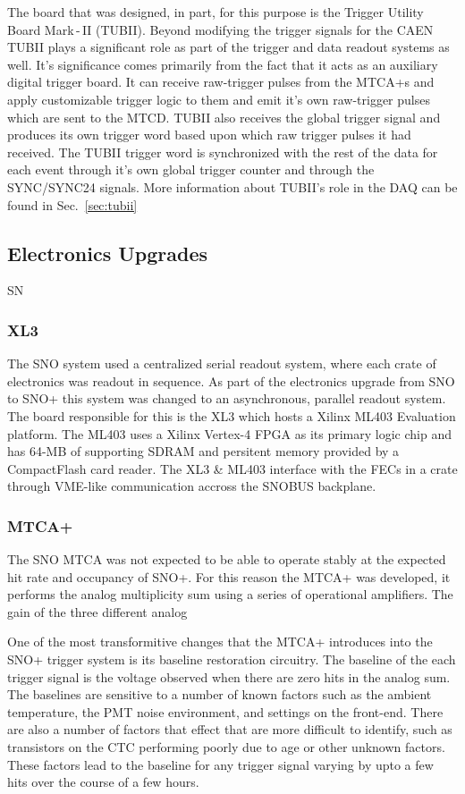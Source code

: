 The board that was designed, in part, for this purpose is the Trigger Utility
Board Mark\,-\,II (TUBII).
Beyond modifying the trigger signals for the CAEN TUBII plays a significant
role as part of the trigger and data readout systems as well.
It's significance comes primarily from the fact that it acts as an auxiliary
digital trigger board. It can receive raw-trigger pulses from the MTCA+s and apply
customizable trigger logic to them and emit it's own raw-trigger pulses which are
sent to the MTCD.
TUBII also receives the global trigger signal and produces its own trigger
word based upon which raw trigger pulses it had received. The TUBII trigger
word is synchronized with the rest of the data for each event through it's own
global trigger counter and through the SYNC/SYNC24 signals. More information about
TUBII's role in the DAQ can be found in Sec.~\ref{sec:tubii}

\subsection{Electronics Upgrades}
\label{sec:upgrades}
SN
\subsubsection{XL3}
\label{sec:xl3}
The SNO system used a centralized serial readout system, where each crate of
electronics was readout in sequence.
As part of the electronics upgrade from SNO to SNO+ this system was changed to
an asynchronous, parallel readout system.
The board responsible for this is the XL3 which hosts a Xilinx ML403
Evaluation platform.
The ML403 uses a Xilinx Vertex-4 FPGA as its primary logic chip and has
64-MB of supporting SDRAM and persitent memory provided by a CompactFlash
card reader.
The XL3 \& ML403 interface with the FECs in a crate through VME-like communication
accross the SNOBUS backplane.

\subsubsection{MTCA+}
\label{sec:mtcap}
The SNO MTCA was not expected to be able to operate stably at the expected
hit rate and occupancy of SNO+. For this reason the MTCA+ was developed,
it performs the analog multiplicity sum using a series of operational
amplifiers. The gain of the three different analog

One of the most transformitive changes that the MTCA+ introduces into
the SNO+ trigger system is its baseline restoration circuitry.
The baseline of the each trigger signal is the voltage observed
when there are zero hits in the analog sum.
The baselines are sensitive to a number of known factors such as the
ambient temperature, the PMT noise environment, and settings
on the front-end.
There are also a number of factors that effect that are more difficult
to identify, such as transistors on the CTC performing poorly due to
age or other unknown factors.
These factors lead to the baseline for any trigger signal varying
by upto a few hits over the course of a few hours.

